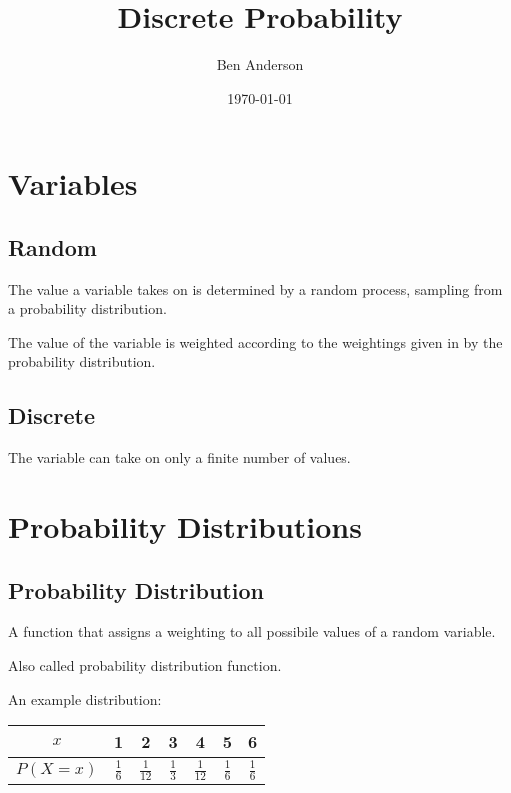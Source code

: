 \documentclass[a4paper,11pt]{article}
\begin{document}
\title{Discrete Probability}
\author{Ben Anderson}
\date{\today}
\maketitle
\pagebreak

\tableofcontents
\pagebreak


\section{Variables}

\subsection{Random}

The value a variable takes on is determined by a random process, sampling from
a probability distribution.

The value of the variable is weighted according to the weightings given in by
the probability distribution.


\subsection{Discrete}

The variable can take on only a finite number of values.




\section{Probability Distributions}

\subsection{Probability Distribution}

A function that assigns a weighting to all possibile values of a random
variable.

Also called probability distribution function.

An example distribution:

\begin{center}
\begin{tabular}{c|c|c|c|c|c|c}
$x$ & 1 & 2 & 3 & 4 & 5 & 6 \\
\hline
$P(X = x)$ & $\frac{1}{6}$ & $\frac{1}{12}$ & $\frac{1}{3}$ & $\frac{1}{12}$ & $\frac{1}{6}$ & $\frac{1}{6}$ \\
\end{tabular}
\end{center}
\end{document}
